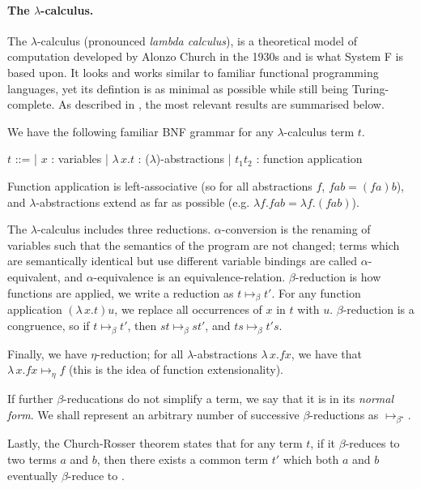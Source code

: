 \documentclass[logo,bsc,singlespacing,parskip,online]{infthesis}
\begin{document}
\paragraph*{The $\lambda$-calculus.} The $\lambda$-calculus (pronounced
\textit{lambda calculus}), is a theoretical model of computation developed by
Alonzo Church in the 1930s and is what System F is based upon. It looks and
works similar to familiar functional programming languages, yet its defintion is
as minimal as possible while still being Turing-complete. As described in
\cite{pierce_types_2002}, the most relevant results are summarised below.

We have the following familiar BNF grammar for any $\lambda$-calculus term $t$.

\begin{center}
\begin{bnf}
  $t$ ::=
  | $x$ : variables
  | $\lambda \, x. t$ : ($\lambda$)-abstractions
  | $t_1 t_2$ : function application
\end{bnf}
\end{center}

Function application is left-associative (so for all abstractions $f$, $f a b =
(f a) b$), and $\lambda$-abstractions extend as far as possible (e.g. $\lambda
f. f a b = \lambda f. (f a b)$).

The $\lambda$-calculus includes three reductions. $\alpha$-conversion is the
renaming of variables such that the semantics of the program are not changed;
terms which are semantically identical but use different variable bindings are
called $\alpha$-equivalent, and $\alpha$-equivalence is an equivalence-relation.
$\beta$-reduction is how functions are applied, we write a reduction as $t
\mapsto_{\beta} t'$. For any function application $(\lambda \, x. t) u$, we
replace all occurrences of $x$ in $t$ with $u$. $\beta$-reduction is a
congruence, so if $t \mapsto_{\beta} t'$, then $st \mapsto_{\beta} st'$, and $ts
\mapsto_{\beta} t's$.

Finally, we have $\eta$-reduction; for all $\lambda$-abstractions $\lambda \, x.
f x$, we have that $\lambda \, x. f x \mapsto_{\eta} f$ (this is the idea of
function extensionality).
  
If further $\beta$-reducations do not simplify a term, we say that it is in its
\textit{normal form}. We shall represent an arbitrary number of successive
$\beta$-reductions as $\mapsto_{\beta^{\star}}$.

Lastly, the Church-Rosser theorem states that for any term $t$, if it
$\beta$-reduces to two terms $a$ and $b$, then there exists a common term $t'$
which both $a$ and $b$ eventually $\beta$-reduce to
\citep{church_properties_1936}.
\end{document}
